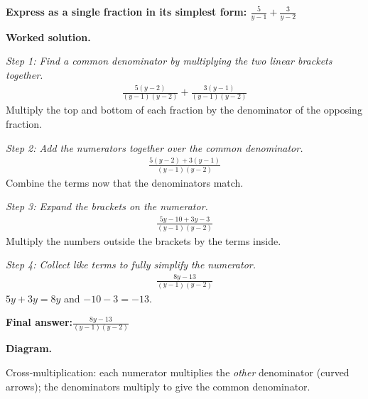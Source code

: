 \documentclass[11pt]{article}
\newcommand{\question}[1]{\par\medskip\noindent\textbf{#1}\par}
\begin{document}
\question{Express as a single fraction in its simplest form: \( \frac{5}{y-1} + \frac{3}{y-2} \)}

\textbf{Worked solution.}

\textit{Step 1: Find a common denominator by multiplying the two linear brackets together.}
\[\begin{gathered}
\frac{5(y-2)}{(y-1)(y-2)} + \frac{3(y-1)}{(y-1)(y-2)}
\end{gathered}\]
Multiply the top and bottom of each fraction by the denominator of the opposing fraction.

\textit{Step 2: Add the numerators together over the common denominator.}
\[\begin{gathered}
\frac{5(y-2) + 3(y-1)}{(y-1)(y-2)}
\end{gathered}\]
Combine the terms now that the denominators match.

\textit{Step 3: Expand the brackets on the numerator.}
\[\begin{gathered}
\frac{5y - 10 + 3y - 3}{(y-1)(y-2)}
\end{gathered}\]
Multiply the numbers outside the brackets by the terms inside.

\textit{Step 4: Collect like terms to fully simplify the numerator.}
\[\begin{gathered}
\frac{8y - 13}{(y-1)(y-2)}
\end{gathered}\]
\( 5y + 3y = 8y \) and \( -10 - 3 = -13 \).

\begin{answerbox}
\textbf{Final answer:}\quad \(\displaystyle \frac{8y - 13}{(y-1)(y-2)}\)
\end{answerbox}
\textbf{Diagram.}

\begin{center}
\end{center}
\small Cross-multiplication: each numerator multiplies the \emph{other} denominator (curved arrows); the denominators multiply to give the common denominator.\normalsize
\end{document}

